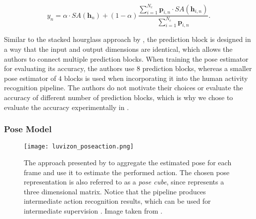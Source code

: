 \begin{equation}
    \label{eq:context_sum}
    y_n = \alpha \cdot SA(\bm{h}_n) + (1 - \alpha) \frac{\sum_{i=1}^{N_c} \bm{p}_{i,n} \cdot SA(\bm{h}_{i,n}) }{\sum_{i=1}^{N_c} \bm{p}_{i,n} }.
\end{equation}

Similar to the stacked hourglass approach by \cite{newell_stacked_2016}, the prediction block is designed in a way that the input and output dimensions are identical, which allows the authors to connect multiple prediction blocks.
When training the pose estimator for evaluating its accuracy, the authors use $8$ prediction blocks, whereas a smaller pose estimator of $4$ blocks is used when incorporating it into the human activity recognition pipeline.
The authors do not motivate their choices or evaluate the accuracy of different number of prediction blocks, which is why we chose to evaluate the accuracy experimentally in .

\subsubsection{Pose Model}
\label{sec:pose_based_action_recognition}
\begin{figure}[htb!]
    \centering
    \texttt{[image: luvizon\_poseaction.png]}
    \caption{The approach presented by \cite{luvizon_2d/3d_2018} to aggregate the estimated pose for each frame and use it to estimate the performed action. The chosen pose representation is also referred to as a \textit{pose cube}, since represents a three dimensional matrix. Notice that the pipeline produces intermediate action recognition results, which can be used for intermediate supervision . Image taken from \cite{luvizon_2d/3d_2018}.}
    \label{fig:luvizon_poseaction}
\end{figure}

